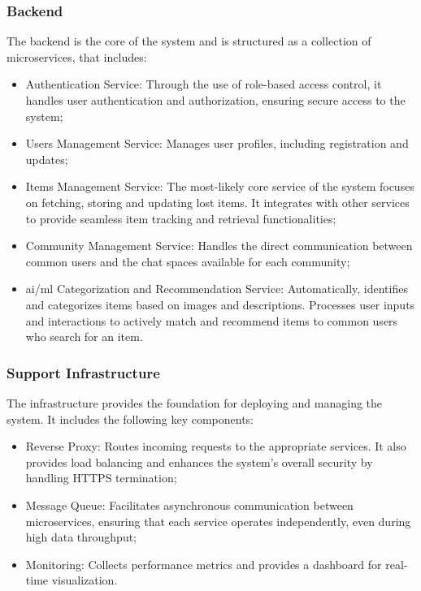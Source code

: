 \subsubsection{Backend}
The backend is the core of the system and is structured as a collection of microservices, that includes:
\begin{itemize}
    \item Authentication Service: Through the use of role-based access control, it handles user authentication and authorization, ensuring secure access to the system;
    \item Users Management Service: Manages user profiles, including registration and updates;
    \item Items Management Service: The most-likely core service of the system focuses on fetching, storing and updating lost items. It integrates with other services to provide seamless item tracking and retrieval functionalities;
    \item Community Management Service: Handles the direct communication between common users and the chat spaces available for each community;
    \item \ac{ai}/\ac{ml} Categorization and Recommendation Service: Automatically, identifies and categorizes items based on images and descriptions. Processes user inputs and interactions to actively match and recommend items to common users who search for an item.
\end{itemize}

\subsubsection{Support Infrastructure}
The infrastructure provides the foundation for deploying and managing the system. It includes the following key components:
\begin{itemize}
    \item Reverse Proxy: Routes incoming requests to the appropriate services. It also provides load balancing and enhances the system's overall security by handling HTTPS termination;
    \item Message Queue: Facilitates asynchronous communication between microservices, ensuring that each service operates independently, even during high data throughput;
    \item Monitoring: Collects performance metrics and provides a dashboard for real-time visualization.
\end{itemize}

